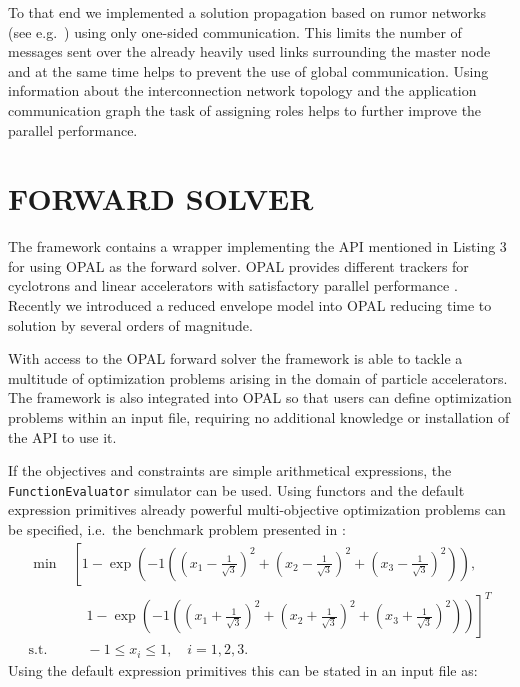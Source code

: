 \documentclass[%
reprint,
amsmath,amssymb,
aps,
]{revtex4-1}
\begin{document}
To that end we implemented a solution propagation based on rumor networks (see
  e.g.\ \cite{bgps:06,ayss:09}) using only one-sided communication.
This limits the number of messages sent over the already heavily used links
  surrounding the master node and at the same time helps to prevent the use of
  global communication.
Using information about the interconnection network topology and the
  application communication graph the task of assigning roles helps to further
  improve the parallel performance.



\section{FORWARD SOLVER} \label{sec:forward-solver}

The framework contains a wrapper implementing the API mentioned in
  Listing 3 for using \textsc{OPAL} \cite{opal} as the forward solver.
\textsc{OPAL} provides different trackers for cyclotrons and linear
  accelerators with satisfactory parallel performance \cite{akir:09}.
Recently we introduced a reduced envelope model \cite{iabc:12} into
  \textsc{OPAL} reducing time to solution by several orders of magnitude.

With access to the \textsc{OPAL} forward solver the framework is able to
  tackle a multitude of optimization problems arising in the domain of
  particle accelerators.
  The framework is also integrated into \textsc{OPAL} so that users can 
  define optimization problems within an input file, requiring no 
  additional knowledge or installation of the API to use it.


If the objectives and constraints are simple arithmetical expressions, the
  \texttt{FunctionEvaluator} simulator can be used.
Using functors and the default expression primitives already powerful
  multi-objective optimization problems can be specified, i.e.\ the benchmark
  problem presented in \cite{hbwh:05}:
%
\small{
\begin{align} \label{eqn:bench}
  \text{ min} & \left[ 1 - \exp \left( -1 \left(
    \left(x_1 - \frac{1}{\sqrt{3}} \right)^2 +
    \left(x_2 - \frac{1}{\sqrt{3}} \right)^2 +
    \left(x_3 - \frac{1}{\sqrt{3}} \right)^2 \right)\right), \right. \\
                    & \quad \left. 1 - \exp \left( -1 \left(
    \left(x_1 + \frac{1}{\sqrt{3}} \right)^2 +
    \left(x_2 + \frac{1}{\sqrt{3}} \right)^2 +
    \left(x_3 + \frac{1}{\sqrt{3}} \right)^2 \right)\right) \right]^T \nonumber \\
    \text{s.t.} \quad & \quad -1 \le x_i \le 1, \quad i=1,2,3 \nonumber
  \text{.}
\end{align}
}
%
Using the default expression primitives this can be stated in an input file
  as:
\end{document}
